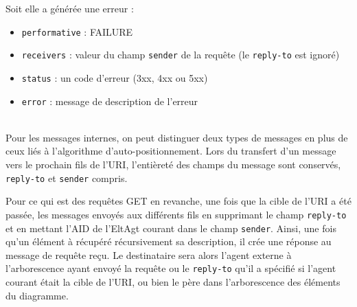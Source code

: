 Soit elle a générée une erreur :
\begin{itemize}
	\item \lstinline$performative$ : FAILURE
	\item \lstinline$receivers$ : valeur du champ \lstinline$sender$ de la requête (le \lstinline$reply-to$ est ignoré)
  \item \lstinline$status$ : un code d'erreur (3xx, 4xx ou 5xx)
  \item \lstinline$error$ : message de description de l'erreur
\end{itemize}
~\\
Pour les messages internes, on peut distinguer deux types de messages en plus de ceux liés à l'algorithme d'auto-positionnement.
Lors du transfert d'un message vers le prochain fils de l'URI, l’entièreté des champs du message sont conservés, \lstinline$reply-to$ et \lstinline$sender$ compris.

Pour ce qui est des requêtes GET en revanche, une fois que la cible de l'URI a été passée, les messages envoyés aux différents fils en supprimant le champ \lstinline$reply-to$ et en mettant l'AID de l'EltAgt courant dans le champ \lstinline$sender$.
Ainsi, une fois qu'un élément à récupéré récursivement sa description, il crée une réponse au message de requête reçu.
Le destinataire sera alors l'agent externe à l'arborescence ayant envoyé la requête ou le \lstinline$reply-to$ qu'il a spécifié si l'agent courant était la cible de l'URI, ou bien le père dans l'arborescence des éléments du diagramme.

